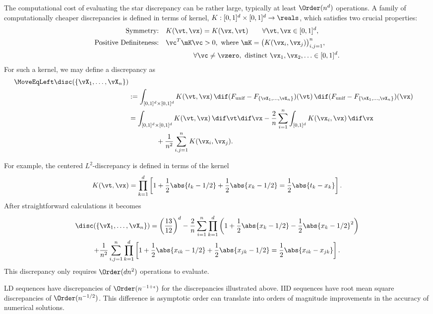 The computational cost of evaluating the star discrepancy can be rather large, typically at least $\Order(n^d)$ operations.  A family of  computationally cheaper discrepancies is defined in terms of kernel, $K: [0,1]^d \times [0,1]^d \to \reals$, which satisfies two crucial properties:
\begin{align*}
    \text{Symmetry:} \quad& K(\vt,\vx) = K(\vx,\vt) \qquad \forall \vt, \vx \in [0,1]^d, \\
    \text{Positive Definiteness:} \quad& \vc^T \mK \vc > 0, \text{ where } \mK =\bigl(K(\vx_i, \vx_j) \bigr)_{i,j=1}^n, \\
    & \qquad \qquad \forall \vc \ne \vzero,  \text{ distinct } \vx_1, \vx_2, \ldots \in [0,1]^d.
\end{align*}
For such a kernel, we may define a discrepancy as 
\begin{align*}
        \MoveEqLeft\disc(\{\vX_1, \ldots, \vX_n\}) \\
        & : = \int_{[0,1]^d \times [0,1]^d} K(\vt, \vx) \, \dif (F_{\text{unif}} - F_{\{\vX_1, \ldots, \vX_n\}})(\vt) \, \dif (F_{\text{unif}} - F_{\{\vX_1, \ldots, \vX_n\}}) (\vx) \\
        & = \int_{[0,1]^d \times [0,1]^d} K(\vt, \vx) \, \dif \vt  \dif \vx
        - \frac 2n \sum_{i=1}^n  \int_{[0,1]^d} K(\vx_i,\vx) \, \dif \vx \\
        & \qquad \qquad + \frac{1}{n^2} \sum_{i,j=1}^n K(\vx_i, \vx_j).
\end{align*}

For example, the centered $L^2$-discrepancy \cite{Hic97a} is defined in terms of the kernel
\begin{equation*}
    K(\vt,\vx) = \prod_{k=1}^d \left[1 + \frac 12 \abs{t_k - 1/2} + \frac 12 \abs{x_k - 1/2} = \frac 12 \abs{t_k - x_k} \right].
\end{equation*}
After straightforward calculations it becomes
\begin{multline*}
        \disc(\{\vX_1, \ldots, \vX_n\})  = \left(\frac{13}{12} \right)^d 
        - \frac 2n \sum_{i=1}^n  \prod_{k=1}^d \left(1 + \frac 12 \abs{x_k - 1/2} - \frac 12 \abs{x_k - 1/2}^2 \right)\\
       + \frac{1}{n^2} \sum_{i,j=1}^n\prod_{k=1}^d \left[1 + \frac 12 \abs{x_{ik} - 1/2} + \frac 12 \abs{x_{jk} - 1/2} = \frac 12 \abs{x_{ik} - x_{jk}} \right].
\end{multline*}
This discrepancy only requires $\Order(dn^2)$ operations to evaluate.

LD sequences have discrepancies of $\Order(n^{-1 +\epsilon})$ for the discrepancies illustrated above.  IID sequences have root mean square discrepancies of $\Order(n^{-1/2})$.  This difference is asymptotic order can translate into orders of magnitude improvements in the accuracy of numerical solutions.

